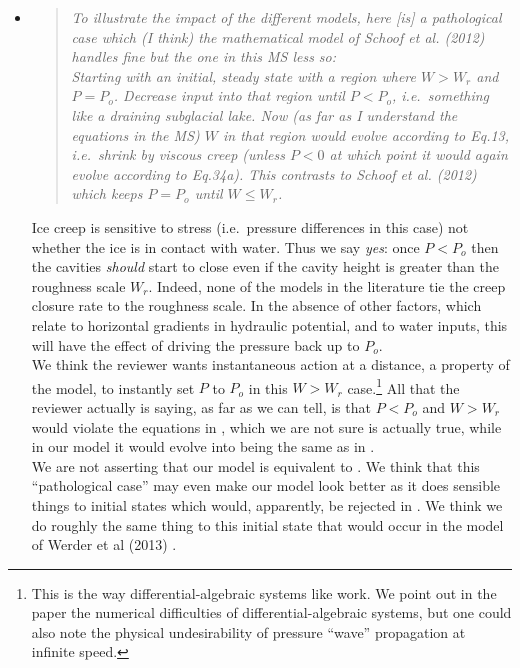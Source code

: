 \documentclass[11pt,reqno]{amsart}
\newcommand{\reply}[2]{
\medskip\medskip
\item  \begin{quote}
\emph{#1}
\end{quote}

\medskip
\noindent #2}
\begin{document}
\begin{itemize}
\reply{To illustrate the impact of the different models, here [is] a pathological case which (I think) the mathematical model of Schoof et al. (2012) handles fine but the one in this MS less so: \\
\indent Starting with an initial, steady state with a region where $W > W_r$ and $P = P_o$.  Decrease input into that region until $P < P_o$, i.e.~something like a draining subglacial lake.  Now (as far as I understand the equations in the MS) $W$ in that region would evolve according to Eq.13, i.e.~shrink by viscous creep (unless $P < 0$ at which point it would again evolve according to Eq.34a). This contrasts to Schoof et al. (2012) which keeps $P = P_o$ until $W \le W_r$.}
{Ice creep is sensitive to stress (i.e.~pressure differences in this case) not whether the ice is in contact with water.  Thus we say \emph{yes}: once $P<P_o$ then the cavities \emph{should} start to close even if the cavity height is greater than the roughness scale $W_r$.  Indeed, none of the models in the literature tie the creep closure rate to the roughness scale.  In the absence of other factors, which relate to horizontal gradients in hydraulic potential, and to water inputs, this will have the effect of driving the pressure back up to $P_o$.  \\
\indent  We think the reviewer wants instantaneous action at a distance, a property of the \cite{Schoofetal2012} model, to instantly set $P$ to $P_o$ in this $W>W_r$ case.\footnote{This is the way differential-algebraic systems like \cite{Schoofetal2012} work.  We point out in the paper the numerical difficulties of differential-algebraic systems, but one could also note the physical undesirability of pressure ``wave'' propagation at infinite speed.}   All that the reviewer actually is saying, as far as we can tell, is that $P<P_o$ and $W>W_r$ would violate the equations in \cite{Schoofetal2012}, which we are not sure is actually true, while in our model it would evolve into being the same as in \cite{Schoofetal2012}. \\
\indent We are not asserting that our model is equivalent to \cite{Schoofetal2012}.  We think that this ``pathological case'' may even make our model look better as it does sensible things to initial states which would, apparently, be rejected in \cite{Schoofetal2012}.  We think we do roughly the same thing to this initial state that would occur in the model of Werder et al (2013) \cite{Werderetal2013}.}


\end{itemize}
\end{document}
